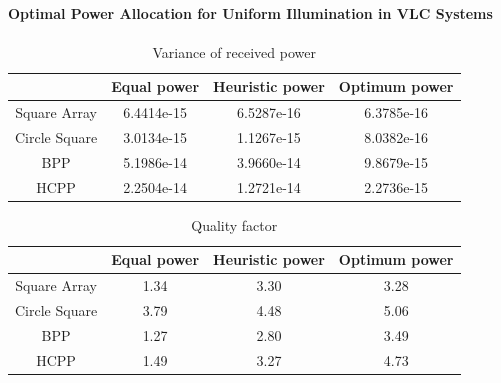 \documentclass[slidestop,usepdftitle=false]{gvvslides}
\begin{document}
\begin{frame}
\frametitle{\,}
\framesubtitle{Optimal Power Allocation for Uniform Illumination in VLC Systems}
\vfill
\begin{table}[]
\centering
\caption{Variance of received power}
\begin{tabular}{|c|c|c|c|}
 \hline
 & Equal power & Heuristic power & Optimum power   \\
 \hline  
Square Array & 6.4414e-15 & 6.5287e-16 & 6.3785e-16   \\
 \hline 
Circle Square & 3.0134e-15 & 1.1267e-15 &  8.0382e-16  \\
 \hline
BPP & 5.1986e-14 & 3.9660e-14 &  9.8679e-15 \\
 \hline
HCPP  & 2.2504e-14  & 1.2721e-14 &  2.2736e-15 \\
 \hline
\end{tabular}
\end{table}
\vfill
\begin{table}[]
\centering
\caption{Quality factor}
\begin{tabular}{|c|c|c|c|}
 \hline
 & Equal power & Heuristic power & Optimum power   \\
 \hline  
Square Array & 1.34 & 3.30 & 3.28   \\
 \hline 
Circle Square & 3.79 & 4.48 &  5.06 \\
 \hline
BPP & 1.27 & 2.80 &  3.49 \\
 \hline
HCPP  & 1.49  & 3.27 &  4.73 \\
 \hline
\end{tabular}
\end{table}
\vfill
\end{frame}
\end{document}
